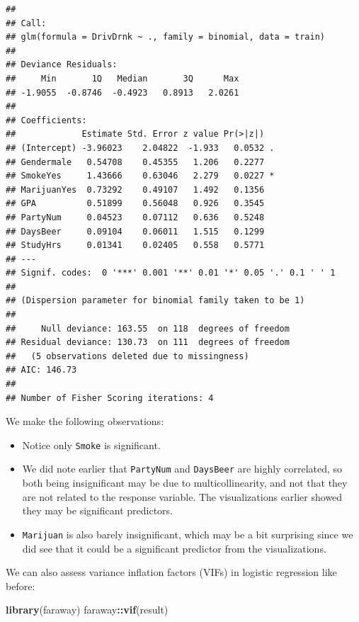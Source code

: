 \documentclass[
]{book}
\newenvironment{Shaded}{\begin{snugshade}}{\end{snugshade}}
\newcommand{\FunctionTok}[1]{\textcolor[rgb]{0.13,0.29,0.53}{\textbf{#1}}}
\newcommand{\NormalTok}[1]{#1}
\newcommand{\SpecialCharTok}[1]{\textcolor[rgb]{0.81,0.36,0.00}{\textbf{#1}}}
\providecommand{\tightlist}{%
  \setlength{\itemsep}{0pt}\setlength{\parskip}{0pt}}
\begin{document}
\begin{verbatim}
## 
## Call:
## glm(formula = DrivDrnk ~ ., family = binomial, data = train)
## 
## Deviance Residuals: 
##     Min       1Q   Median       3Q      Max  
## -1.9055  -0.8746  -0.4923   0.8913   2.0261  
## 
## Coefficients:
##             Estimate Std. Error z value Pr(>|z|)  
## (Intercept) -3.96023    2.04822  -1.933   0.0532 .
## Gendermale   0.54708    0.45355   1.206   0.2277  
## SmokeYes     1.43666    0.63046   2.279   0.0227 *
## MarijuanYes  0.73292    0.49107   1.492   0.1356  
## GPA          0.51899    0.56048   0.926   0.3545  
## PartyNum     0.04523    0.07112   0.636   0.5248  
## DaysBeer     0.09104    0.06011   1.515   0.1299  
## StudyHrs     0.01341    0.02405   0.558   0.5771  
## ---
## Signif. codes:  0 '***' 0.001 '**' 0.01 '*' 0.05 '.' 0.1 ' ' 1
## 
## (Dispersion parameter for binomial family taken to be 1)
## 
##     Null deviance: 163.55  on 118  degrees of freedom
## Residual deviance: 130.73  on 111  degrees of freedom
##   (5 observations deleted due to missingness)
## AIC: 146.73
## 
## Number of Fisher Scoring iterations: 4
\end{verbatim}

We make the following observations:

\begin{itemize}
\tightlist
\item
  Notice only \texttt{Smoke} is significant.
\item
  We did note earlier that \texttt{PartyNum} and \texttt{DaysBeer} are highly correlated, so both being insignificant may be due to multicollinearity, and not that they are not related to the response variable. The visualizations earlier showed they may be significant predictors.
\item
  \texttt{Marijuan} is also barely insignificant, which may be a bit surprising since we did see that it could be a significant predictor from the visualizations.
\end{itemize}

We can also assess variance inflation factors (VIFs) in logistic regression like before:

\begin{Shaded}
\begin{Highlighting}[]
\FunctionTok{library}\NormalTok{(faraway)}
\NormalTok{faraway}\SpecialCharTok{::}\FunctionTok{vif}\NormalTok{(result)}
\end{Highlighting}
\end{Shaded}
\end{document}
